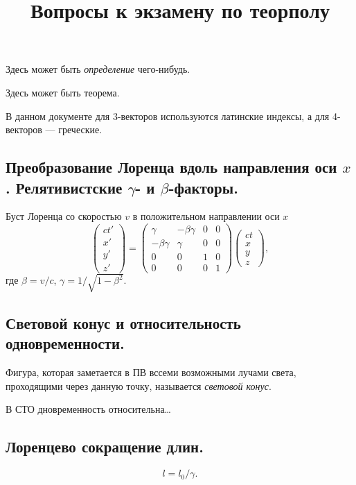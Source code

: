 \documentclass[a4paper,12pt]{article}
\title{Вопросы к экзамену по теорполу}
\begin{document}
%
\maketitle
\tableofcontents
\section{}
\begin{dfn}
	Здесь может быть \emph{определение} чего-нибудь.
\end{dfn}
\begin{thm}
	Здесь может быть теорема.
\end{thm}
В данном документе для 3-векторов используются латинские индексы, а для
4-векторов --- греческие.
\subsection{Преобразование Лоренца вдоль направления оси $x$. Релятивистские
$\gamma$- и $\beta$-факторы.}
\label{subsec:1}
Буст Лоренца со скоростью $v$ в положительном направлении оси  $x$
\[
	\begin{pmatrix} ct' \\ x' \\ y' \\ z' \end{pmatrix} =
	\begin{pmatrix} \gamma & -\beta \gamma & 0 & 0\\
	-\beta \gamma & \gamma & 0 & 0\\
0 & 0 & 1 & 0\\
0 & 0 & 0 & 1\end{pmatrix} 
\begin{pmatrix} ct \\ x \\ y \\ z \end{pmatrix} 
,\] 
где $\beta=v /c$, $\gamma = 1 / \sqrt{1-\beta^2} $.
\subsection{Световой конус и относительность одновременности.}
\begin{dfn}
	Фигура, которая заметается в ПВ вссеми возможными лучами света,
	проходящими через данную точку, называется \emph{световой конус}.
\end{dfn}
В СТО дновременность относительна\ldots
\subsection{Лоренцево сокращение длин.}
\[
l=l_0 /\gamma
.\] 
\end{document}
